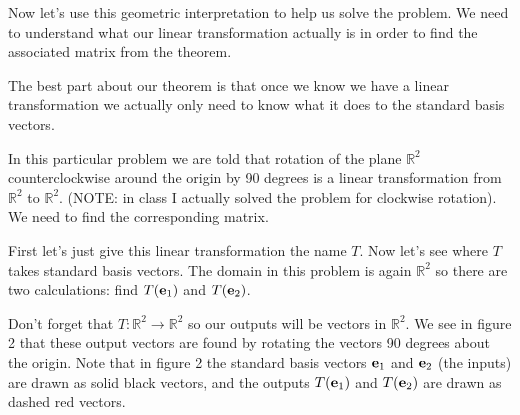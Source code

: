 \documentclass[12pt]{article}
\begin{document}
Now let's use this geometric interpretation to help us solve the problem.  We need to understand what our linear transformation actually is in order to find the associated matrix from the theorem.

The best part about our theorem is that once we know we have a linear transformation we actually only need to know what it does to the standard basis vectors.

In this particular problem we are told that rotation of the plane $\mathbb{R}^2$ counterclockwise around the origin by 90 degrees is a linear transformation from $\mathbb{R}^2$ to $\mathbb{R}^2$. (NOTE:  in class I actually solved the problem for clockwise rotation).  We need to find the corresponding matrix.

First let's just give this linear transformation the name $T$.  Now let's see where $T$ takes standard basis vectors.  The domain in this problem is again $\mathbb{R}^2$ so there are two calculations: find $T({\bf e}_1)$ and $T({\bf e}_2)$.

Don't forget that $T:\mathbb{R}^2 \to \mathbb{R}^2$ so our outputs will be vectors in $\mathbb{R}^2$.  We see in figure 2 that these output vectors are found by rotating the vectors 90 degrees about the origin. Note that in figure 2 the standard basis vectors ${\bf e}_1$ and ${\bf e}_2$ (the inputs) are drawn as solid black vectors, and the outputs $T({\bf e}_1)$ and $T({\bf e}_2)$ are drawn as dashed red vectors.
\end{document}
